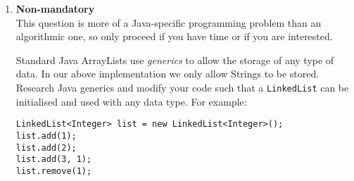 \documentclass[11pt,a4paper]{report}
\begin{document}
\begin{enumerate}
    \item \textbf{Non-mandatory}\\
        This question is more of a Java-specific programming problem than an algorithmic one, so only proceed if you have time or if you are interested.

        Standard Java ArrayLists use \textit{generics} to allow the storage of any type of data. In our above implementation we only allow Strings to be stored. Research Java generics and modify your code such that a \texttt{LinkedList} can be initialised and used with any data type. For example:

\begin{verbatim}
LinkedList<Integer> list = new LinkedList<Integer>();
list.add(1);
list.add(2);
list.add(3, 1);
list.remove(1);
\end{verbatim}

\end{enumerate}
\end{document}
